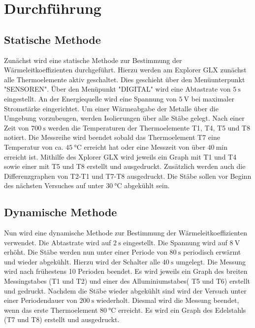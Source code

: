 
\section{Durchführung}
\label{sec:Durchführung}

\subsection{Statische Methode}
Zunächst wird eine statische Methode zur Bestimmung der Wärmeleitkoeffizienten
  durchgeführt. Hierzu werden am Explorer GLX zunächst alle Thermoelemente aktiv geschaltet.
  Dies geschieht über den Menüunterpunkt "SENSOREN". Über den Menüpunkt "DIGITAL"
   wird eine Abtastrate von $\SI{5}{\second}$ eingestellt. An der Energiequelle wird
    eine Spannung von $\SI{5}{\volt}$ bei maximaler Stromstärke eingerichtet. Um
     einer Wärmeabgabe der Metalle über die Umgebung vorzubeugen, werden
     Isolierungen über alle Stäbe gelegt. Nach einer Zeit von $\SI{700}{\second}$
     werden die Temperaturen der Thermoelemente T1, T4, T5 und T8 notiert. Die Messreihe
      wird beendet sobald das Thermoelement T7 eine Temperatur von ca.
       $\SI{45}{\degreeCelsius}$ erreicht hat oder eine Messzeit von über
       $\SI{40}{\minute}$ erreicht ist. Mithilfe des Xplorer GLX wird jeweils
       ein Graph mit T1 und T4 sowie einer mit T5 und T8 erstellt und ausgedruckt.
       Zusätzlich werden auch die Differenzgraphen von T2-T1 und T7-T8 ausgedruckt.
       Die Stäbe sollen vor Beginn des nächsten Versuches auf unter $\SI{30}{\degreeCelsius}$ abgekühlt sein.

\subsection{Dynamische Methode}
Nun wird eine dynamische Methode zur Bestimmung der Wärmeleitkoeffizienten verwendet.
       Die Abtastrate wird auf $\SI{2}{\second}$ eingestellt. Die Spannung wird
       auf $\SI{8}{\volt}$ erhöht. Die Stäbe werden nun unter einer Periode von $\SI{80}{\second}$
        periodisch erwärmt und wieder abgekühlt. Hierzu wird der Schalter alle
        $\SI{40}{\second}$ umgelegt. Die Messung wird nach frühestens 10 Perioden
        beendet. Es wird jeweils ein Graph des breiten Messingstabes (T1 und T2)
        und einer des Alluminiumstabes( T5 und T6) erstellt und gedruckt.
        Nachdem die Stäbe wieder abgekühlt sind wird der Versuch unter einer
        Periodendauer von $\SI{200}{\second}$ wiederholt. Diesmal wird die Messung
         beendet, wenn das erste Thermoelement $\SI{80}{\degreeCelsius}$ erreicht.
         Es wird ein Graph des Edelstahls (T7 und T8) erstellt und ausgedruckt.


